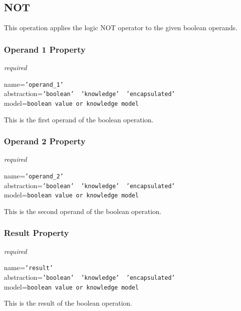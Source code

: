 %
%
%
%
%
%

\subsection{NOT}
\label{not_heading}

This operation applies the logic NOT operator to the given boolean operands.

\subsubsection{Operand 1 Property}

\emph{required}

name=\texttt{'operand\_1'}\\
abstraction=\texttt{'boolean' \vline\ 'knowledge' \vline\ 'encapsulated'}\\
model=\texttt{boolean value or knowledge model}

This is the first operand of the boolean operation.

\subsubsection{Operand 2 Property}

\emph{required}

name=\texttt{'operand\_2'}\\
abstraction=\texttt{'boolean' \vline\ 'knowledge' \vline\ 'encapsulated'}\\
model=\texttt{boolean value or knowledge model}

This is the second operand of the boolean operation.

\subsubsection{Result Property}

\emph{required}

name=\texttt{'result'}\\
abstraction=\texttt{'boolean' \vline\ 'knowledge' \vline\ 'encapsulated'}\\
model=\texttt{boolean value or knowledge model}

This is the result of the boolean operation.

